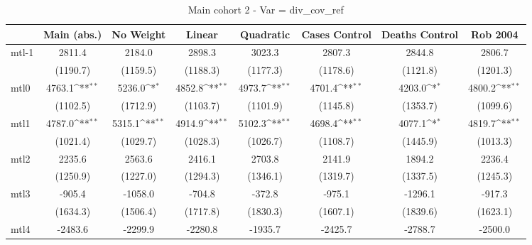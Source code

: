 \documentclass{article}
\begin{document}
{
\def\sym#1{\ifmmode^{#1}\else\(^{#1}\)\fi}
\begin{longtable}{l*{7}{c}}
\caption{Main cohort 2 - Var = div\_cov\_ref}\\
\hline\hline\endfirsthead\hline\endhead\hline\endfoot\endlastfoot
                &\multicolumn{1}{c}{Main (abs.)}&\multicolumn{1}{c}{No Weight}&\multicolumn{1}{c}{Linear}&\multicolumn{1}{c}{Quadratic}&\multicolumn{1}{c}{Cases Control}&\multicolumn{1}{c}{Deaths Control}&\multicolumn{1}{c}{Rob 2004}\\
\hline
mtl-1           &   2811.4         &   2184.0         &   2898.3         &   3023.3         &   2807.3         &   2844.8         &   2806.7         \\
                & (1190.7)         & (1159.5)         & (1188.3)         & (1177.3)         & (1178.6)         & (1121.8)         & (1201.3)         \\
mtl0            &   4763.1\sym{**} &   5236.0\sym{*}  &   4852.8\sym{**} &   4973.7\sym{**} &   4701.4\sym{**} &   4203.0\sym{*}  &   4800.2\sym{**} \\
                & (1102.5)         & (1712.9)         & (1103.7)         & (1101.9)         & (1145.8)         & (1353.7)         & (1099.6)         \\
mtl1            &   4787.0\sym{**} &   5315.1\sym{**} &   4914.9\sym{**} &   5102.3\sym{**} &   4698.4\sym{**} &   4077.1\sym{*}  &   4819.7\sym{**} \\
                & (1021.4)         & (1029.7)         & (1028.3)         & (1026.7)         & (1108.7)         & (1445.9)         & (1013.3)         \\
mtl2            &   2235.6         &   2563.6         &   2416.1         &   2703.8         &   2141.9         &   1894.2         &   2236.4         \\
                & (1250.9)         & (1227.0)         & (1294.3)         & (1346.1)         & (1319.7)         & (1337.5)         & (1245.3)         \\
mtl3            &   -905.4         &  -1058.0         &   -704.8         &   -372.8         &   -975.1         &  -1296.1         &   -917.3         \\
                & (1634.3)         & (1506.4)         & (1717.8)         & (1830.3)         & (1607.1)         & (1839.6)         & (1623.1)         \\
mtl4            &  -2483.6         &  -2299.9         &  -2280.8         &  -1935.7         &  -2425.7         &  -2788.7         &  -2500.0         \\

\end{longtable}}
\end{document}
